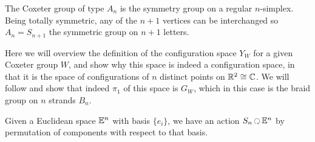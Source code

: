 \documentclass[class=article, crop=false]{standalone}
\begin{document}
The Coxeter group of type $A_n$ is the symmetry group on a regular $n$-simplex. Being totally symmetric, any of the $n+1$ vertices can be interchanged so $A_n = S_{n+1}$ the symmetric group on $n+1$ letters. 

Here we will overview the definition of the configuration space $Y_W$ for a given Coxeter group $W$, and show why this space is indeed a configuration space, in that it is the space of configurations of $n$ distinct points on $\mathbb{R}^2 \cong \mathbb{C}$. We will follow \cite{fox_braid_1962} and show that indeed $\pi_1$ of this space is $G_W$, which in this case is the braid group on $n$ strands $B_n$.

Given a Euclidean space $\mathbb{E}^n$ with basis $\{e_i\}$, we have an action $S_n \acts \E^n$ by permutation of components with respect to that basis.
\end{document}
